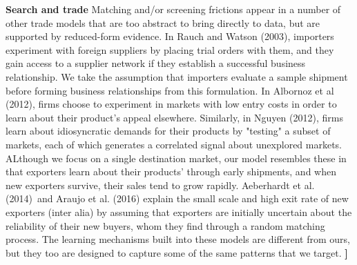 \documentclass[12pt]{article}
\begin{document}
\textbf{Search and trade} Matching and/or screening frictions appear in a
number of other trade models that are too abstract to bring directly to
data, but are supported by reduced-form evidence. In Rauch and Watson
(2003), importers experiment with foreign suppliers by placing trial orders
with them, and they gain access to a supplier network if they establish a
successful business relationship. We take the assumption that importers
evaluate a sample shipment before forming business relationships from this
formulation. In Albornoz et al (2012), firms choose to experiment in markets
with low entry costs in order to learn about their product's appeal
elsewhere. Similarly, in Nguyen (2012), firms learn about idiosyncratic
demands for their products by "testing" a subset of markets, each of which
generates a correlated signal about unexplored markets. ALthough we focus on
a single destination market, our model resembles these in that exporters
learn about their products' through early shipments, and when new exporters
survive, their sales tend to grow rapidly. Aeberhardt et al. (2014)\ and
Araujo et al. (2016) explain the small scale and high exit rate of new
exporters (inter alia) by assuming that exporters are initially uncertain
about the reliability of their new buyers, whom they find through a random
matching process. The learning mechanisms built into these models are
different from ours, but they too are designed to capture some of the same
patterns that we target. \textbf{]}
\end{document}

